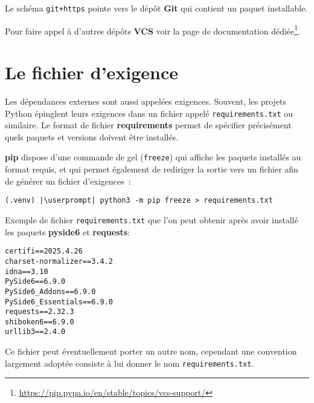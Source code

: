 Le schéma \texttt{git+https} pointe vers le dépôt \textbf{Git} qui contient un paquet installable.

Pour faire appel à d'autres dépôts \textbf{VCS} voir la page de documentation dédiée\footnote{\url{https://pip.pypa.io/en/stable/topics/vcs-support/}}.

\section{Le fichier d'exigence}
Les dépendances externes sont aussi appelées exigences. Souvent, les projets Python épinglent leurs exigences dans un fichier appelé \texttt{requirements.txt} ou similaire. Le format de fichier \textbf{requirements} permet de spécifier précisément quels paquets et versions doivent être installés.

\textbf{pip} dispose d'une commande de gel (\texttt{freeze}) qui affiche les paquets installés au format requis, et qui permet également de rediriger la sortie vers un fichier afin de générer un fichier d’exigences :
\begin{lstlisting}[style=bash]
(.venv) |\userprompt| python3 -m pip freeze > requirements.txt
\end{lstlisting}

Exemple de fichier \texttt{requirements.txt} que l'on peut obtenir après avoir installé les paquets \textbf{pyside6} et \textbf{requests}:
\begin{lstlisting}[style=file]
certifi==2025.4.26
charset-normalizer==3.4.2
idna==3.10
PySide6==6.9.0
PySide6_Addons==6.9.0
PySide6_Essentials==6.9.0
requests==2.32.3
shiboken6==6.9.0
urllib3==2.4.0
\end{lstlisting}

Ce fichier peut éventuellement porter un autre nom, cependant une convention largement adoptée consiste à lui donner le nom \texttt{requirements.txt}.


